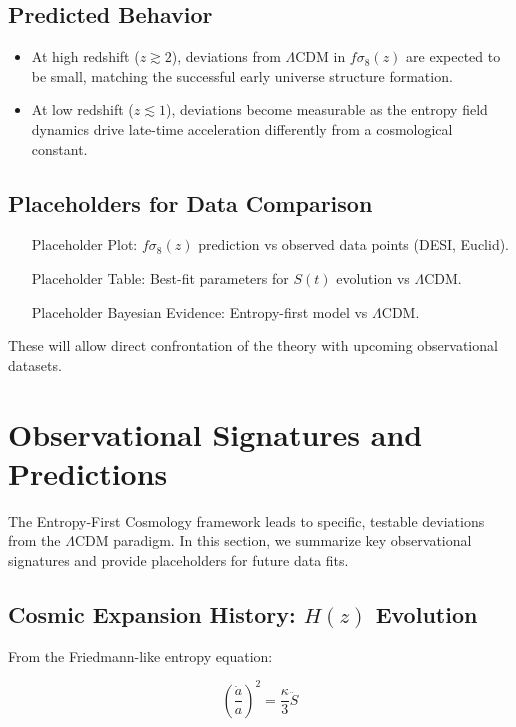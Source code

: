 \documentclass{article}
\begin{document}
\subsection{Predicted Behavior}
\begin{itemize}
\item At high redshift ($z \gtrsim 2$), deviations from $\Lambda$CDM in $f\sigma_8(z)$ are expected to be small, matching the successful early universe structure formation.
\item At low redshift ($z \lesssim 1$), deviations become measurable as the entropy field dynamics drive late-time acceleration differently from a cosmological constant.
\end{itemize}

\subsection{Placeholders for Data Comparison}

\begin{itemize}
    \item [Placeholder] Plot: $f\sigma_8(z)$ prediction vs observed data points (DESI, Euclid).
    \item [Placeholder] Table: Best-fit parameters for $S(t)$ evolution vs $\Lambda$CDM.
    \item [Placeholder] Bayesian Evidence: Entropy-first model vs $\Lambda$CDM.
\end{itemize}

These will allow direct confrontation of the theory with upcoming observational datasets.

\section{Observational Signatures and Predictions}

The Entropy-First Cosmology framework leads to specific, testable deviations from the $\Lambda$CDM paradigm.
In this section, we summarize key observational signatures and provide placeholders for future data fits.

\subsection{Cosmic Expansion History: $H(z)$ Evolution}

From the Friedmann-like entropy equation:

\[
\left( \frac{\dot{a}}{a} \right)^2 = \frac{\kappa}{3} \ddot{S}
\]
\end{document}

